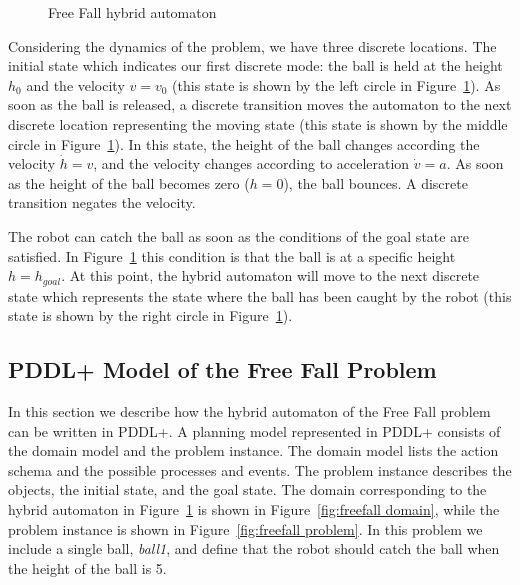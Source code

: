\begin{figure}[ht]
\centering

\caption{Free Fall hybrid automaton}
\label{fig:Free Fall hybrid automaton}
\end{figure}

Considering the dynamics of the problem, we have three discrete locations. The initial state which indicates our first discrete mode: the ball is held at the height $h_0$ and the velocity $v = v_0$ (this state is shown by the left circle in Figure~\ref{fig:Free Fall hybrid automaton}). As soon as the ball is released, a discrete transition moves the automaton to the next discrete location representing the moving state (this state is shown by the middle circle in Figure~\ref{fig:Free Fall hybrid automaton}). In this state, the height of the ball changes according the velocity $\dot{h}=v$, and the velocity changes according to acceleration $\dot{v}=a$. As soon as the height of the ball becomes zero ($h=0$), the ball bounces. A discrete transition negates the velocity.

The robot can catch the ball as soon as the conditions of the goal state are satisfied. In Figure~\ref{fig:Free Fall hybrid automaton} this condition is that the ball is at a specific height $h=h_{goal}$. At this point, the hybrid automaton will move to the next discrete state which represents the state where the ball has been caught by the robot (this state is shown by the right circle in Figure~\ref{fig:Free Fall hybrid automaton}).

\subsection{PDDL+ Model of the Free Fall Problem}

In this section we describe how the hybrid automaton of the Free Fall problem can be written in PDDL+. A planning model represented in PDDL+ consists of the domain model and the problem instance. The domain model lists the action schema and the possible processes and events. The problem instance describes the objects, the initial state, and the goal state. The domain corresponding to the hybrid automaton in Figure~\ref{fig:Free Fall hybrid automaton} is shown in Figure~\ref{fig:freefall domain}, while the problem instance is shown in Figure~\ref{fig:freefall problem}. In this problem we include a single ball, \textit{ball1}, and define that the robot should catch the ball when the height of the ball is 5.

